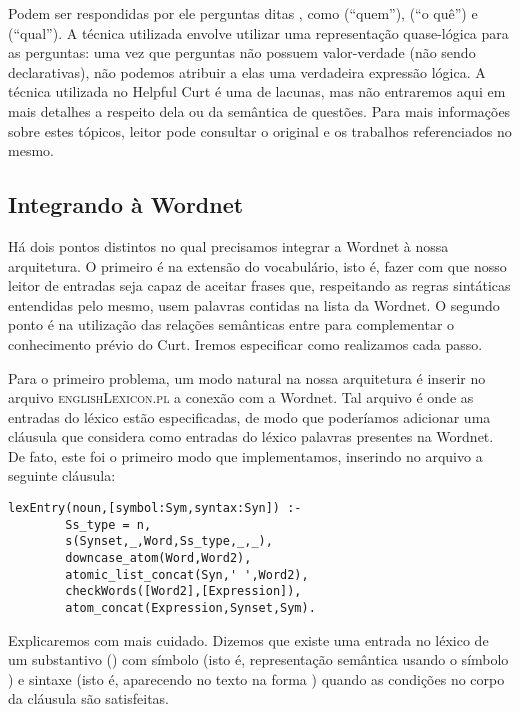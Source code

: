 	Podem ser respondidas por ele perguntas ditas , como  (``quem''),  (``o quê'') e  (``qual''). A técnica utilizada envolve utilizar uma representação quase-lógica para as perguntas: uma vez que perguntas não possuem valor-verdade (não sendo declarativas), não podemos atribuir a elas uma verdadeira expressão lógica. A técnica utilizada no Helpful Curt é uma de lacunas, mas não entraremos aqui em mais detalhes a respeito dela ou da semântica de questões. Para mais informações sobre estes tópicos, leitor pode consultar o original \citep[pp.~293--300, 303--304]{BlackburnBos:2005} e os trabalhos referenciados no mesmo. 

\subsection{Integrando à Wordnet}
\label{sec:wordnet}


	Há dois pontos distintos no qual precisamos integrar a Wordnet à nossa arquitetura. O primeiro é na extensão do vocabulário, isto é, fazer com que nosso leitor de entradas seja capaz de aceitar frases que, respeitando as regras sintáticas entendidas pelo mesmo, usem palavras contidas na lista da Wordnet. O segundo ponto é na utilização das relações semânticas entre  para complementar o conhecimento prévio do Curt. Iremos especificar como realizamos cada passo.
	
	
	Para o primeiro problema, um modo natural na nossa arquitetura é inserir no arquivo \textsc{englishLexicon.pl} a conexão com a Wordnet. Tal arquivo é onde as entradas do léxico estão especificadas, de modo que poderíamos adicionar uma cláusula que considera como entradas do léxico palavras presentes na Wordnet. De fato, este foi o primeiro modo que implementamos, inserindo no arquivo a seguinte cláusula:
	
	\begin{Verbatim}[fontseries=b,gobble=1]
	lexEntry(noun,[symbol:Sym,syntax:Syn]) :-
	    Ss_type = n,
	    s(Synset,_,Word,Ss_type,_,_),
	    downcase_atom(Word,Word2),
	    atomic_list_concat(Syn,' ',Word2),
	    checkWords([Word2],[Expression]),
	    atom_concat(Expression,Synset,Sym).
	\end{Verbatim}	
	
	Explicaremos com mais cuidado. Dizemos que existe uma entrada no léxico de um substantivo () com símbolo  (isto é, representação semântica usando o símbolo ) e sintaxe  (isto é, aparecendo no texto na forma ) quando as condições no corpo da cláusula são satisfeitas.
	
